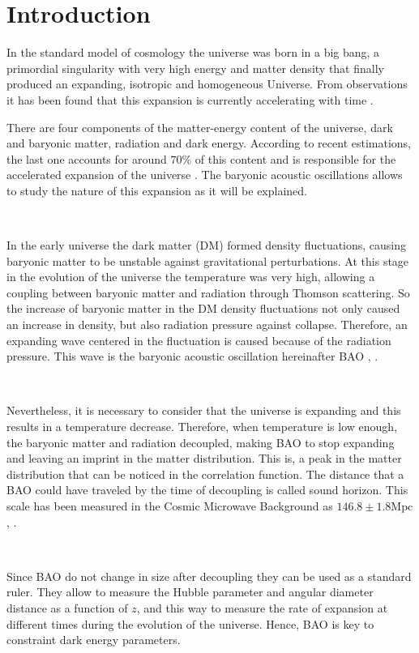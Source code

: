 \chapter{Introduction}\label{intro}


In the standard model of cosmology the universe was born in a big bang, a primordial singularity with very
high energy and matter density that finally produced an
expanding, isotropic and homogeneous Universe. From observations it has been found that this expansion  
is currently accelerating with time \cite{Hamuy}.

There are four components of the matter-energy content of the universe, 
dark and baryonic matter, radiation and dark energy. According to recent estimations, the last one accounts for around $70\%$ of this content and is responsible for the accelerated expansion of the universe \cite{Pilar}. 
The baryonic acoustic oscillations allows to study the nature of this expansion as it will be explained.

\

In the early universe the dark matter (DM) formed density fluctuations, causing baryonic matter to be unstable against
gravitational perturbations. At this stage in the evolution of the universe the temperature was very high, allowing a coupling between
baryonic matter and radiation through Thomson scattering. 
So the increase of baryonic matter in the DM density fluctuations not only caused an increase 
in density, but also radiation pressure against collapse. Therefore, an expanding wave centered in the fluctuation
is caused because of the radiation pressure. This wave is the baryonic acoustic oscillation hereinafter BAO \cite{Hu}, \cite{SH02}. 

\	

Nevertheless, it is necessary to consider that the universe is expanding and this results in a  
temperature decrease. Therefore, when temperature is low enough, the baryonic matter and radiation 
decoupled, making BAO to stop expanding and leaving an imprint in the matter distribution. This is, 
a peak in the matter distribution that can be noticed in the correlation function. 
The distance that a BAO could have traveled by the time of
decoupling is called sound horizon. This scale has been measured in the Cosmic Microwave Background 
as $146.8\pm 1.8 \mathrm{Mpc}$, \cite{SIZE}.  

\

Since BAO do not change in size after decoupling they can be used as a standard ruler.  They allow to
measure the Hubble parameter and angular diameter distance as a function of $z$, and this way to measure the rate of expansion at different times during the evolution of the universe. Hence, BAO is key to constraint dark energy parameters. 


